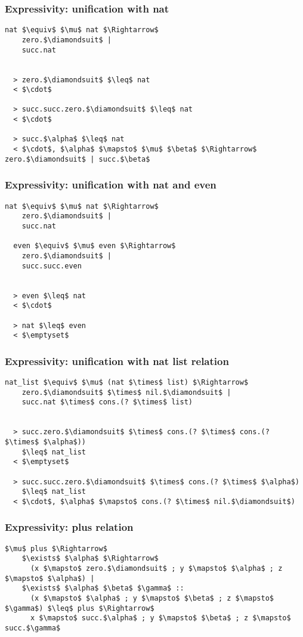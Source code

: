 \documentclass{beamer}
\begin{document}
\begin{frame}[fragile]
  \frametitle{Expressivity: unification with nat}

  \begin{lstlisting}[]
  nat $\equiv$ $\mu$ nat $\Rightarrow$ 
    zero.$\diamondsuit$ | 
    succ.nat


  > zero.$\diamondsuit$ $\leq$ nat 
  < $\cdot$

  > succ.succ.zero.$\diamondsuit$ $\leq$ nat 
  < $\cdot$

  > succ.$\alpha$ $\leq$ nat 
  < $\cdot$, $\alpha$ $\mapsto$ $\mu$ $\beta$ $\Rightarrow$ zero.$\diamondsuit$ | succ.$\beta$
  \end{lstlisting} 

\end{frame}

\begin{frame}[fragile]
  \frametitle{Expressivity: unification with nat and even}

  \begin{lstlisting}[]
  nat $\equiv$ $\mu$ nat $\Rightarrow$ 
    zero.$\diamondsuit$ | 
    succ.nat

  even $\equiv$ $\mu$ even $\Rightarrow$ 
    zero.$\diamondsuit$ | 
    succ.succ.even 


  > even $\leq$ nat 
  < $\cdot$

  > nat $\leq$ even 
  < $\emptyset$
  \end{lstlisting} 

\end{frame}


\begin{frame}[fragile]
  \frametitle{Expressivity: unification with nat list relation}

  \begin{lstlisting}[]
  nat_list $\equiv$ $\mu$ (nat $\times$ list) $\Rightarrow$ 
    zero.$\diamondsuit$ $\times$ nil.$\diamondsuit$ | 
    succ.nat $\times$ cons.(? $\times$ list)


  > succ.zero.$\diamondsuit$ $\times$ cons.(? $\times$ cons.(? $\times$ $\alpha$))
    $\leq$ nat_list
  < $\emptyset$

  > succ.succ.zero.$\diamondsuit$ $\times$ cons.(? $\times$ $\alpha$) 
    $\leq$ nat_list
  < $\cdot$, $\alpha$ $\mapsto$ cons.(? $\times$ nil.$\diamondsuit$)
  \end{lstlisting} 
\end{frame}


\begin{frame}[fragile]
  \frametitle{Expressivity: plus relation}

  \begin{lstlisting}[]
  $\mu$ plus $\Rightarrow$ 
    $\exists$ $\alpha$ $\Rightarrow$ 
      (x $\mapsto$ zero.$\diamondsuit$ ; y $\mapsto$ $\alpha$ ; z $\mapsto$ $\alpha$) |
    $\exists$ $\alpha$ $\beta$ $\gamma$ :: 
      (x $\mapsto$ $\alpha$ ; y $\mapsto$ $\beta$ ; z $\mapsto$ $\gamma$) $\leq$ plus $\Rightarrow$ 
      x $\mapsto$ succ.$\alpha$ ; y $\mapsto$ $\beta$ ; z $\mapsto$ succ.$\gamma$
  \end{lstlisting}
\end{frame}
\end{document}
